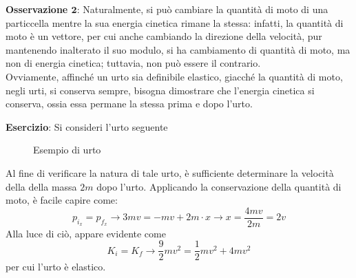 \documentclass[a4paper]{extarticle}
\begin{document}
\vspace{1em}
\noindent
\textbf{Osservazione $\boldsymbol{2}$}: Naturalmente, si può cambiare la quantità di moto di una particcella mentre la sua energia cinetica rimane la stessa: infatti, la quantità di moto è un vettore, per cui anche cambiando la direzione della velocità, pur mantenendo inalterato il suo modulo, si ha cambiamento di quantità di moto, ma non di energia cinetica; tuttavia, non può essere il contrario.\\
Ovviamente, affinché un urto sia definibile elastico, giacché la quantità di moto, negli urti, si conserva sempre, bisogna dimostrare che l'energia cinetica si conserva, ossia essa permane la stessa prima e dopo l'urto.

\newpage
\noindent
\textbf{Esercizio}: Si consideri l'urto seguente
\begin{figure}[H]
  \centering
  \hspace{5em}
  \caption{Esempio di urto}
  \label{esempio_di_urto_1}
\end{figure}

\noindent
Al fine di verificare la natura di tale urto, è sufficiente determinare la velocità della della massa $2m$ dopo l'urto. Applicando la conservazione della quantità di moto, è facile capire come:
\[p_{i_x} = p_{f_x} \longrightarrow 3mv = -mv + 2m \cdot x \longrightarrow x = \frac{4mv}{2m} = 2v\]
Alla luce di ciò, appare evidente come
\[K_i=K_f \longrightarrow \frac{9}{2}mv^2 = \frac{1}{2}m v^2 + 4 mv^2\]
per cui l'urto è elastico.
\end{document}
